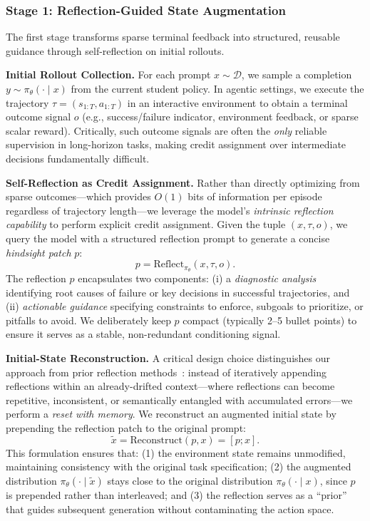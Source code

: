 \documentclass{article}
\theoremstyle{plain}
\theoremstyle{definition}
\theoremstyle{remark}
\begin{document}
\subsubsection{Stage 1: Reflection-Guided State Augmentation}
\label{sec:stage1}

The first stage transforms sparse terminal feedback into structured, reusable guidance through self-reflection on initial rollouts.

\textbf{Initial Rollout Collection.}
For each prompt $x\sim\mathcal{D}$, we sample a completion $y\sim\pi_\theta(\cdot\mid x)$ from the current student policy.
In agentic settings, we execute the trajectory $\tau=(s_{1:T}, a_{1:T})$ in an interactive environment to obtain a terminal outcome signal $o$ (e.g., success/failure indicator, environment feedback, or sparse scalar reward).
Critically, such outcome signals are often the \emph{only} reliable supervision in long-horizon tasks, making credit assignment over intermediate decisions fundamentally difficult.

\textbf{Self-Reflection as Credit Assignment.}
Rather than directly optimizing from sparse outcomes—which provides $O(1)$ bits of information per episode regardless of trajectory length—we leverage the model's \emph{intrinsic reflection capability} to perform explicit credit assignment.
Given the tuple $(x, \tau, o)$, we query the model with a structured reflection prompt to generate a concise \emph{hindsight patch} $p$:
\begin{equation}
p = \mathrm{Reflect}_{\pi_\theta}(x, \tau, o).
\end{equation}
The reflection $p$ encapsulates two components:
(i) a \emph{diagnostic analysis} identifying root causes of failure or key decisions in successful trajectories, and
(ii) \emph{actionable guidance} specifying constraints to enforce, subgoals to prioritize, or pitfalls to avoid.
We deliberately keep $p$ compact (typically 2–5 bullet points) to ensure it serves as a stable, non-redundant conditioning signal.

\textbf{Initial-State Reconstruction.}
A critical design choice distinguishes our approach from prior reflection methods~\cite{shinn2023reflexion,madaan2023selfrefine}: instead of iteratively appending reflections within an already-drifted context—where reflections can become repetitive, inconsistent, or semantically entangled with accumulated errors—we perform a \emph{reset with memory}.
We reconstruct an augmented initial state by prepending the reflection patch to the original prompt:
\begin{equation}
\tilde{x} = \mathrm{Reconstruct}(p, x) = [p; x].
\label{eq:reconstruct}
\end{equation}
This formulation ensures that: (1) the environment state remains unmodified, maintaining consistency with the original task specification; (2) the augmented distribution $\pi_\theta(\cdot\mid\tilde{x})$ stays close to the original distribution $\pi_\theta(\cdot\mid x)$, since $p$ is prepended rather than interleaved; and (3) the reflection serves as a ``prior'' that guides subsequent generation without contaminating the action space.
\end{document}

